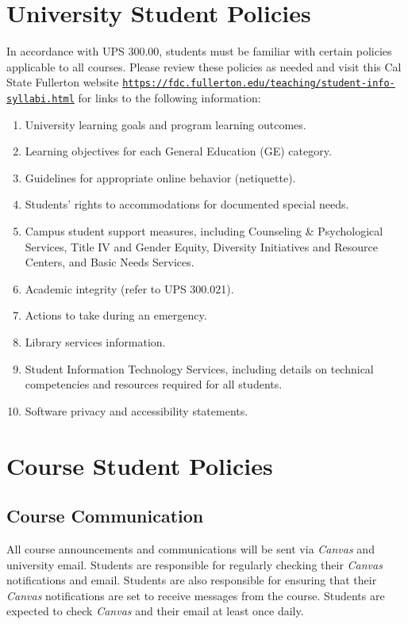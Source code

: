 \documentclass[11pt, letterpaper]{article}
\begin{document}
\section{University Student Policies}

In accordance with UPS 300.00, students must be familiar with certain policies applicable to all courses. Please review these policies as needed and visit this Cal State Fullerton website \texttt{\href{https://fdc.fullerton.edu/teaching/student-info-syllabi.html}{https://fdc.fullerton.edu/teaching/student-info-syllabi.html}} for links to the following information:

\begin{enumerate}
    \item   University learning goals and program learning outcomes.
    \item	Learning objectives for each General Education (GE) category.
    \item	Guidelines for appropriate online behavior (netiquette).
    \item	Students' rights to accommodations for documented special needs.
    \item   Campus student support measures, including Counseling \& Psychological Services, Title IV and Gender Equity, Diversity Initiatives and Resource Centers, and Basic Needs Services.
    \item	Academic integrity (refer to UPS 300.021).
    \item	Actions to take during an emergency.
    \item	Library services information.
    \item	Student Information Technology Services, including details on technical competencies and resources required for all students.
    \item	Software privacy and accessibility statements.
\end{enumerate}

\section{Course Student Policies}

\subsection*{Course Communication}
All course announcements and communications will be sent via \emph{Canvas} and university email. Students are responsible for regularly checking their \emph{Canvas} notifications and email. Students are also responsible for ensuring that their \emph{Canvas} notifications are set to receive messages from the course. Students are expected to check \emph{Canvas} and their email at least once daily.
\end{document}
